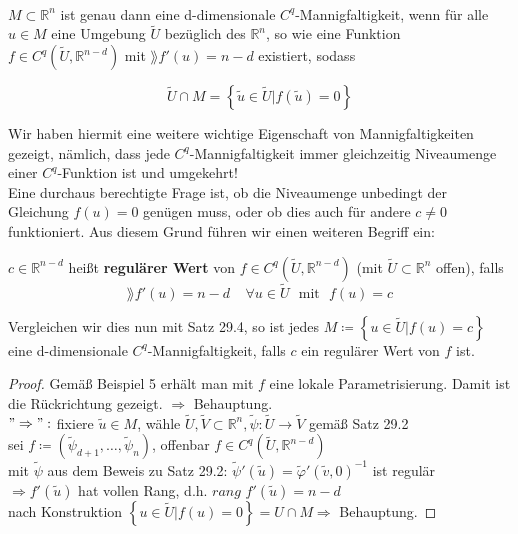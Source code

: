 \begin{satz}
\mbox{} \\
$M \subset \mathbb{R}^n $ ist genau dann eine d-dimensionale $C^q$-Mannigfaltigkeit, wenn für alle $u \in M $ eine Umgebung $\tilde{U}$ bezüglich des $\mathbb{R}^n$, so wie eine Funktion $f \in C^q \left( \tilde{U}, \mathbb{R}^{n-d} \right)$ mit $\rang f' (u) = n-d $ existiert, sodass 

\begin{equation*}
\tilde{U} \cap M = \left\lbrace \tilde{u} \in \tilde{U} | f (\tilde{u}) = 0 \right\rbrace
\end{equation*}

\end{satz}

Wir haben hiermit eine weitere wichtige Eigenschaft von Mannigfaltigkeiten gezeigt, nämlich, dass jede $C^q$-Mannigfaltigkeit immer gleichzeitig Niveaumenge einer $C^q$-Funktion ist und umgekehrt!\\
\linebreak
Eine durchaus berechtigte Frage ist, ob die Niveaumenge unbedingt der Gleichung $f(u)=0$ genügen muss, oder ob dies auch für andere $c\neq 0$ funktioniert. Aus diesem Grund führen wir einen weiteren Begriff ein:\\

\begin{definition} $c \in \mathbb{R}^{n-d} $ heißt \textbf{regulärer Wert} von
$f \in C^q \left( \tilde{U}, \mathbb{R}^{n-d} \right) $ (mit $\tilde{U} \subset \mathbb{R}^n $ offen), falls 
\begin{equation*}
\rang f' (u) = n-d \ \ \ \ \ \forall u \in \tilde{U}\ \ \ \mathrm{mit}\ \ \ f(u) = c
\end{equation*}

Vergleichen wir dies nun mit Satz 29.4, so ist jedes $M \coloneqq \left\lbrace u \in \tilde{U} | f(u) = c \right\rbrace $ 
eine d-dimensionale $C^q$-Mannigfaltigkeit, falls $c$ ein regulärer Wert von $f$ ist.
\end{definition}
\begin{proof}
Gemäß Beispiel 5 erhält man mit $f$ eine lokale Parametrisierung. Damit ist die Rückrichtung gezeigt.
$\Rightarrow$ Behauptung. \\
$"\Rightarrow":$ fixiere $\tilde{u} \in M$, 
wähle $\tilde{U}, \tilde{V} \subset \mathbb{R}^n, 
\tilde{\psi}: \tilde{U} \rightarrow \tilde{V} $ gemäß Satz 29.2 \\
sei $f \coloneqq \left( \tilde{\psi}_{d+1}, \ldots , \tilde{\psi}_n \right)$,
offenbar $f \in C^q \left(  \tilde{U}, \mathbb{R}^{n-d} \right) $ \\
mit $\tilde{\psi}$ aus dem Beweis zu Satz 29.2:
$\tilde{\psi}' (\tilde{u}) = \tilde{\varphi}' (\tilde{v}, 0)^{-1} $ ist regulär \\
$\Rightarrow f'(\tilde{u}) $ hat vollen Rang, d.h. $\textit{rang } f'(\tilde{u}) = n-d $ \\
nach Konstruktion $ \left\lbrace u \in \tilde{U} | f(u) = 0 \right\rbrace = U \cap M
\Rightarrow $ Behauptung.
\end{proof}

